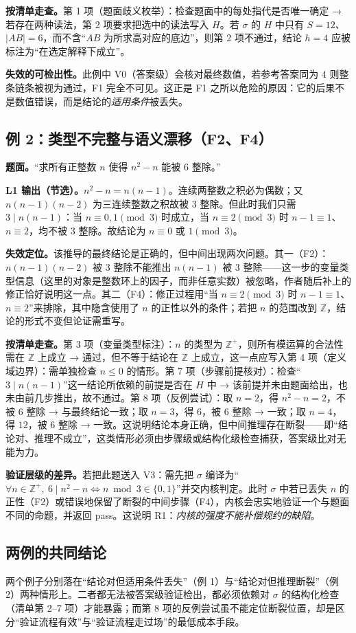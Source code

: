 \textbf{按清单走查。}第 1 项（题面歧义枚举）：检查题面中的每处指代是否唯一确定 → 若存在两种读法，第 2 项要求把选中的读法写入 $H$。若 $\sigma$ 的 $H$ 中只有 $S = 12$、$|AB| = 6$，而不含“$AB$ 为所求高对应的底边”，则第 2 项不通过，结论 $h = 4$ 应被标注为“在选定解释下成立”。

\textbf{失效的可检出性。}此例中 V0（答案级）会核对最终数值，若参考答案同为 $4$ 则整条链条被视为通过，F1 完全不可见。这正是 F1 之所以危险的原因：它的后果不是数值错误，而是结论的\emph{适用条件}被丢失。

\subsection{例 2：类型不完整与语义漂移（F2、F4）}

\textbf{题面。}“求所有正整数 $n$ 使得 $n^2 - n$ 能被 $6$ 整除。”

\textbf{L1 输出（节选）。}$n^2 - n = n(n-1)$。连续两整数之积必为偶数；又 $n(n-1)(n-2)$ 为三连续整数之积故被 $3$ 整除。但此时我们只需 $3 \mid n(n-1)$：当 $n \equiv 0,1 \pmod 3$ 时成立，当 $n \equiv 2 \pmod 3$ 时 $n-1 \equiv 1$、$n \equiv 2$，均不被 $3$ 整除。故结论为 $n \equiv 0$ 或 $1 \pmod 3$。

\textbf{失效定位。}该推导的最终结论是正确的，但中间出现两次问题。其一（F2）：$n(n-1)(n-2)$ 被 $3$ 整除不能推出 $n(n-1)$ 被 $3$ 整除——这一步的变量类型信息（这里的对象是整数环上的因子，而非任意实数）被忽略，作者随后补上的修正恰好说明这一点。其二（F4）：修正过程用“当 $n\equiv 2 \pmod 3$ 时 $n-1\equiv 1$、$n\equiv 2$”来排除，其中隐含使用了 $n$ 的正性以外的条件；若把 $n$ 的范围改到 $\mathbb{Z}$，结论的形式不变但论证需重写。

\textbf{按清单走查。}第 3 项（变量类型标注）：$n$ 的类型为 $\mathbb{Z}^{+}$，则所有模运算的合法性需在 $\mathbb{Z}$ 上成立 → 通过，但不等于结论在 $\mathbb{Z}$ 上成立，这一点应写入第 4 项（定义域边界）：需单独检查 $n \le 0$ 的情形。第 7 项（步骤前提核对）：检查“$3 \mid n(n-1)$”这一结论所依赖的前提是否在 $H$ 中 → 该前提并未由题面给出，也未由前几步推出，故不通过。第 8 项（反例尝试）：取 $n = 2$，得 $n^2 - n = 2$，不被 $6$ 整除 → 与最终结论一致；取 $n = 3$，得 $6$，被 $6$ 整除 → 一致；取 $n = 4$，得 $12$，被 $6$ 整除 → 一致。这说明结论本身正确，但中间推理存在断裂——即“结论对、推理不成立”，这类情形必须由步骤级或结构化级检查捕获，答案级比对无能为力。

\textbf{验证层级的差异。}若把此题送入 V3：需先把 $\sigma$ 编译为“$\forall n \in \mathbb{Z}^{+},\ 6 \mid n^2 - n \iff n \bmod 3 \in \{0,1\}$”并交内核判定。此时 $\sigma$ 中若已丢失 $n$ 的正性（F2）或错误地保留了断裂的中间步骤（F4），内核会忠实地验证一个与题面不同的命题，并返回 pass。这说明 R1：\emph{内核的强度不能补偿规约的缺陷}。

\subsection{两例的共同结论}

两个例子分别落在“结论对但适用条件丢失”（例 1）与“结论对但推理断裂”（例 2）两种情形上。二者都无法被答案级验证检出，都必须依赖对 $\sigma$ 的结构化检查（清单第 2--7 项）才能暴露；而第 8 项的反例尝试虽不能定位断裂位置，却是区分“验证流程有效”与“验证流程走过场”的最低成本手段。
